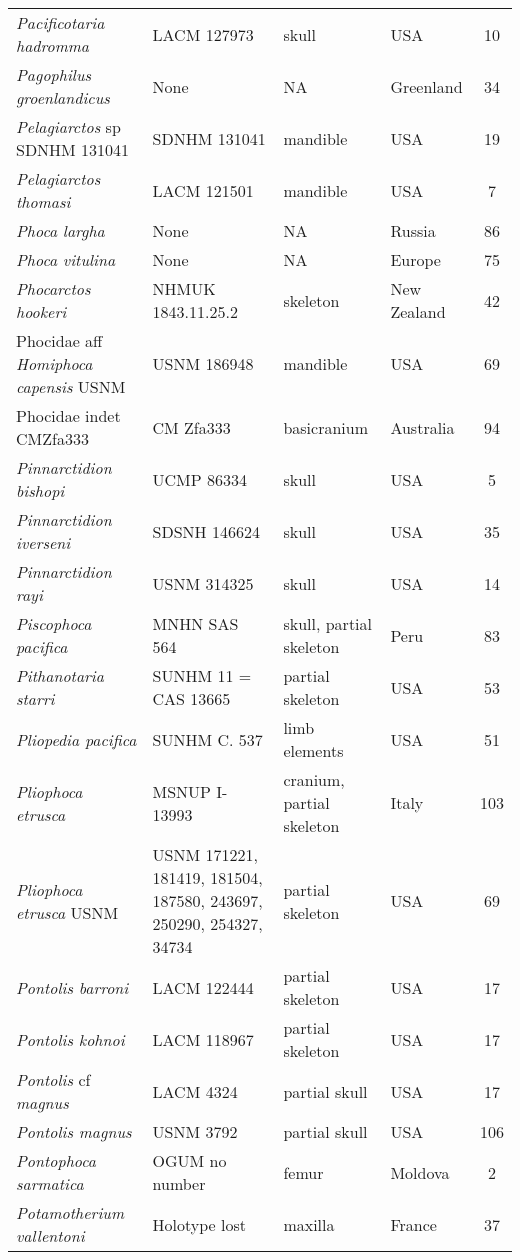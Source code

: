 \begin{longtable}{p{}p{}p{}lc}
\textit{Pacificotaria hadromma} & LACM 127973	& skull	& USA & 10\\
\textit{Pagophilus groenlandicus} &	None & 	NA & 	Greenland & 34\\
\textit{Pelagiarctos} sp SDNHM 131041 &	SDNHM 131041 & 	mandible & 	USA & 19\\
\textit{Pelagiarctos thomasi} &	LACM 121501 & 	mandible & 	USA & 7\\
\textit{Phoca largha} &	None & 	NA & 	Russia	 & 86\\
\textit{Phoca vitulina} &	None & 	NA & 	Europe & 75\\
\textit{Phocarctos hookeri} &	NHMUK 1843.11.25.2 & 	skeleton & 	New Zealand & 42\\
Phocidae aff \textit{Homiphoca capensis} USNM	& USNM 186948	& mandible	& USA & 69\\
Phocidae indet CMZfa333	& CM Zfa333 & 	basicranium & 	Australia & 94\\
\textit{Pinnarctidion bishopi} &	UCMP 86334 & 	skull & 	USA & 5\\
\textit{Pinnarctidion iverseni} &	SDSNH 146624 & 	skull & 	USA & 35\\
\textit{Pinnarctidion rayi} &	USNM 314325 & 	skull & 	USA & 14\\
\textit{Piscophoca pacifica} &	MNHN SAS 564 & 	skull, partial skeleton	 & Peru & 83\\
\textit{Pithanotaria starri} &	SUNHM 11 = CAS 13665 & 	partial skeleton & 	USA & 53\\
\textit{Pliopedia pacifica} &	SUNHM C. 537 & 	limb elements & 	USA & 51\\
\textit{Pliophoca etrusca} &	MSNUP I-13993 & 	cranium, partial skeleton & 	Italy & 103\\
\textit{Pliophoca etrusca} USNM & USNM 171221, 181419, 181504, 187580, 243697, 250290, 254327, 34734 &	partial skeleton & USA & 69\\
\textit{Pontolis barroni} &	LACM 122444 & 	partial skeleton & 	USA & 17\\
\textit{Pontolis kohnoi} &	LACM 118967 & 	partial skeleton & 	USA & 17\\
\textit{Pontolis} cf \textit{magnus} &	LACM 4324	& partial skull	& USA & 17\\
\textit{Pontolis magnus} &	USNM 3792 & 	partial skull & 	USA & 106\\
\textit{Pontophoca sarmatica} &	OGUM no number	& femur	& Moldova & 2\\
\textit{Potamotherium vallentoni}	 & Holotype lost	& maxilla	& France & 37\\

\end{longtable}

